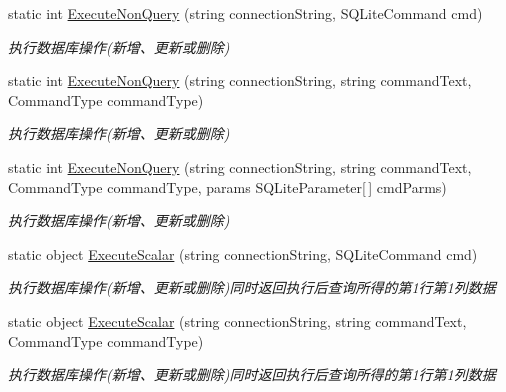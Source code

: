 \begin{DoxyCompactItemize}
\item 
static int \hyperlink{class_x_c_l_net_tools_1_1_data_base_1_1_s_q_lite_1_1_s_q_lite_helper_a20c508df465baf613204fc20b7f42d4c}{Execute\-Non\-Query} (string connection\-String, S\-Q\-Lite\-Command cmd)
\begin{DoxyCompactList}\small\item\em 执行数据库操作(新增、更新或删除) \end{DoxyCompactList}\item 
static int \hyperlink{class_x_c_l_net_tools_1_1_data_base_1_1_s_q_lite_1_1_s_q_lite_helper_a934ecf6111b8ec537b6ea97b54b4d409}{Execute\-Non\-Query} (string connection\-String, string command\-Text, Command\-Type command\-Type)
\begin{DoxyCompactList}\small\item\em 执行数据库操作(新增、更新或删除) \end{DoxyCompactList}\item 
static int \hyperlink{class_x_c_l_net_tools_1_1_data_base_1_1_s_q_lite_1_1_s_q_lite_helper_abb12a188027b7197116cea2dc2cf3086}{Execute\-Non\-Query} (string connection\-String, string command\-Text, Command\-Type command\-Type, params S\-Q\-Lite\-Parameter\mbox{[}$\,$\mbox{]} cmd\-Parms)
\begin{DoxyCompactList}\small\item\em 执行数据库操作(新增、更新或删除) \end{DoxyCompactList}\item 
static object \hyperlink{class_x_c_l_net_tools_1_1_data_base_1_1_s_q_lite_1_1_s_q_lite_helper_a5294ae0c127272d14b81ce861fbc418c}{Execute\-Scalar} (string connection\-String, S\-Q\-Lite\-Command cmd)
\begin{DoxyCompactList}\small\item\em 执行数据库操作(新增、更新或删除)同时返回执行后查询所得的第1行第1列数据 \end{DoxyCompactList}\item 
static object \hyperlink{class_x_c_l_net_tools_1_1_data_base_1_1_s_q_lite_1_1_s_q_lite_helper_a65ee6d56d5b8b92809288bcecd9e63fc}{Execute\-Scalar} (string connection\-String, string command\-Text, Command\-Type command\-Type)
\begin{DoxyCompactList}\small\item\em 执行数据库操作(新增、更新或删除)同时返回执行后查询所得的第1行第1列数据 \end{DoxyCompactList}\item 

\end{DoxyCompactItemize}

